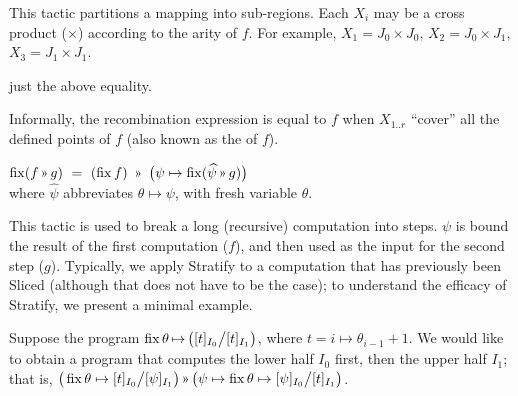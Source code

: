 This tactic partitions a mapping into sub-regions. Each $X_i$ may be a cross product ($\times$)
according to the arity of $f$.
For example, $X_1=J_0\times J_0$, $X_2=J_0\times J_1$, $X_3=J_1\times J_1$.

\Obligations just the above equality.

Informally, the recombination expression is equal to $f$
when $X_{1..r}$ ``cover'' all the defined points of $f$ (also known as the  of $f$).

\medskip
{}
$\fix (f\applt g) ~=~ (\fix f) ~\applt~ \big(\psi\mapsto \fix (\widehat\psi\applt g)\big)$
\\
where $\widehat\psi$ abbreviates $\theta\mapsto\psi$, with fresh variable $\theta$.

This tactic is used to break a long (recursive) computation into steps. $\psi$ is bound the result of the first computation ($f$), and then used as the input for the second step ($g$).
Typically, we apply \textsf{Stratify} to a computation that has previously been \textsf{Slice}d (although that does not have to be the case); to understand the efficacy of \textsf{Stratify}, we present a minimal example.

Suppose the program $\operatorname{fix} \theta{\,\mapsto\,}\big([t]_{I_0}\big/[t]_{I_1}\big)$, where $t=i\mapsto\theta_{i-1}+1$.
We would like to obtain a program that computes the lower half $I_0$ first, then the upper half $I_1$; that is, 
$\big(\fix\theta\mapsto[t]_{I_0}\big/[\psi]_{I_1}\big) \applt
  \big(\psi \mapsto \fix\theta\mapsto[\psi]_{I_0}\big/[t]_{I_1}\big)$.

\begin{center}
\end{center}

